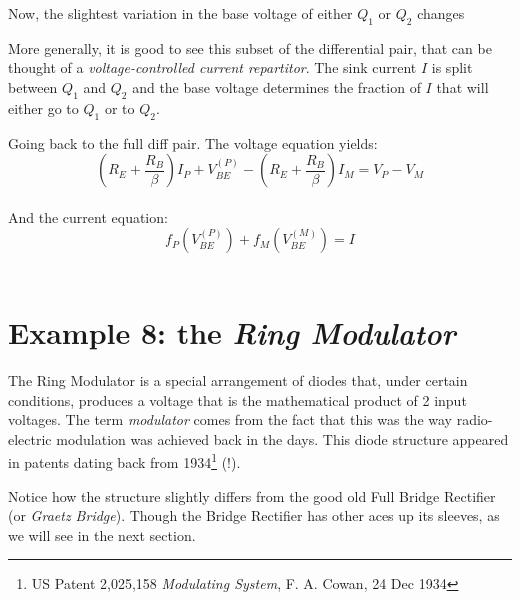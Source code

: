 \documentclass[10pt]{article}
\begin{document}
Now, the slightest variation in the base voltage of either $Q_1$ or $Q_2$ changes

More generally, it is good to see this subset of the differential pair, that can be thought of a \textit{voltage-controlled current repartitor}. The sink current $I$ is split between $Q_1$ and $Q_2$ and the base voltage determines the fraction of $I$ that will either go to $Q_1$ or to $Q_2$.

Going back to the full diff pair. The voltage equation yields:
$$
	\left(R_E + \dfrac{R_B}{\beta} \right)I_P + V_{BE}^{(P)} - \left(R_E + \dfrac{R_B}{\beta} \right)I_M = V_P - V_M
$$\\

And the current equation:
$$
	f_P \left( V_{BE}^{(P)} \right) + f_M \left( V_{BE}^{(M)} \right) = I
$$\\



\section*{Example 8: the \textit{Ring Modulator}}

The Ring Modulator is a special arrangement of diodes that, under certain conditions, produces a voltage that is the mathematical product of 2 input voltages. The term \textit{modulator} comes from the fact that this was the way radio-electric modulation was achieved back in the days. This diode structure appeared in patents dating back from 1934\footnote{US Patent 2,025,158 \textit{Modulating System}, F. A. Cowan, 24 Dec 1934} (!). 

Notice how the structure slightly differs from the good old Full Bridge Rectifier (or \textit{Graetz Bridge}). Though the Bridge Rectifier has other aces up its sleeves, as we will see in the next section.
\end{document}
